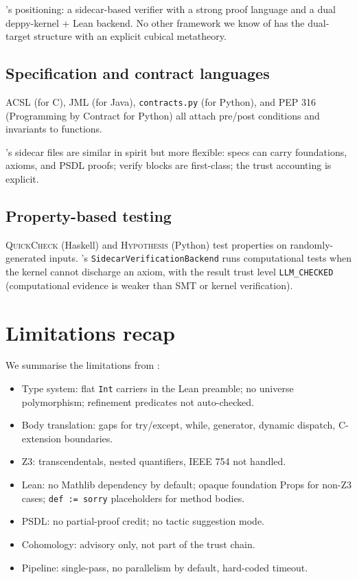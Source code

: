 \Deppy{}'s positioning: a sidecar-based verifier with a strong
proof language and a dual deppy-kernel + Lean backend.  No other
framework we know of has the dual-target structure with an
explicit cubical metatheory.

\subsection{Specification and contract languages}

\textsc{ACSL} (for C), \textsc{JML} (for Java), \texttt{contracts.py}
(for Python), and PEP 316 (Programming by Contract for Python)
all attach pre/post conditions and invariants to functions.

\Deppy{}'s sidecar files are similar in spirit but more flexible:
specs can carry foundations, axioms, and PSDL proofs; verify
blocks are first-class; the trust accounting is explicit.

\subsection{Property-based testing}

\textsc{QuickCheck} (Haskell) and \textsc{Hypothesis} (Python) test
properties on randomly-generated inputs.  \Deppy{}'s
\texttt{SidecarVerificationBackend} runs computational tests when
the kernel cannot discharge an axiom, with the result trust level
\texttt{LLM\_CHECKED} (computational evidence is weaker than SMT or
kernel verification).

\section{Limitations recap}
\label{sec:limits-recap}

We summarise the limitations from :

\begin{itemize}[leftmargin=1.7em]
  \item Type system: flat \texttt{Int} carriers in the Lean
    preamble; no universe polymorphism; refinement predicates not
    auto-checked.
  \item Body translation: gaps for try/except, while, generator,
    dynamic dispatch, C-extension boundaries.
  \item Z3: transcendentals, nested quantifiers, IEEE 754 not
    handled.
  \item Lean: no Mathlib dependency by default; opaque foundation
    Props for non-Z3 cases; \texttt{def := sorry} placeholders for
    method bodies.
  \item PSDL: no partial-proof credit; no tactic suggestion mode.
  \item Cohomology: advisory only, not part of the trust chain.
  \item Pipeline: single-pass, no parallelism by default, hard-coded
    \Lean{} timeout.
\end{itemize}

